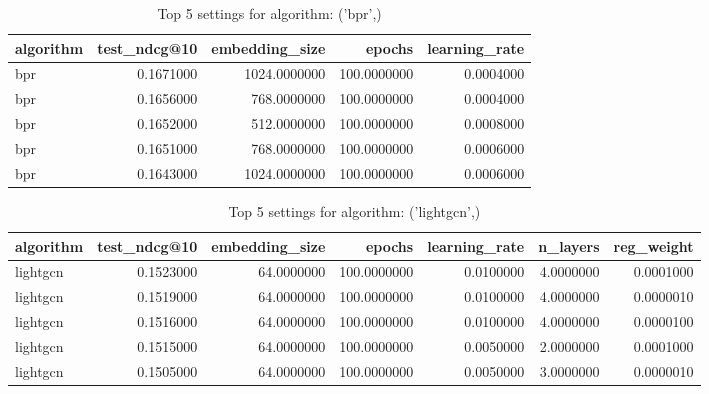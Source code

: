\begin{table}
\caption{Top 5 settings for algorithm: ('bpr',)}
\label{tab:('bpr',)_top5}
\begin{tabular}{lrrrr}
\toprule
algorithm & test_ndcg@10 & embedding_size & epochs & learning_rate \\
\midrule
bpr & 0.1671000 & 1024.0000000 & 100.0000000 & 0.0004000 \\
bpr & 0.1656000 & 768.0000000 & 100.0000000 & 0.0004000 \\
bpr & 0.1652000 & 512.0000000 & 100.0000000 & 0.0008000 \\
bpr & 0.1651000 & 768.0000000 & 100.0000000 & 0.0006000 \\
bpr & 0.1643000 & 1024.0000000 & 100.0000000 & 0.0006000 \\
\bottomrule
\end{tabular}
\end{table}


\begin{table}
\caption{Top 5 settings for algorithm: ('lightgcn',)}
\label{tab:('lightgcn',)_top5}
\begin{tabular}{lrrrrrr}
\toprule
algorithm & test_ndcg@10 & embedding_size & epochs & learning_rate & n_layers & reg_weight \\
\midrule
lightgcn & 0.1523000 & 64.0000000 & 100.0000000 & 0.0100000 & 4.0000000 & 0.0001000 \\
lightgcn & 0.1519000 & 64.0000000 & 100.0000000 & 0.0100000 & 4.0000000 & 0.0000010 \\
lightgcn & 0.1516000 & 64.0000000 & 100.0000000 & 0.0100000 & 4.0000000 & 0.0000100 \\
lightgcn & 0.1515000 & 64.0000000 & 100.0000000 & 0.0050000 & 2.0000000 & 0.0001000 \\
lightgcn & 0.1505000 & 64.0000000 & 100.0000000 & 0.0050000 & 3.0000000 & 0.0000010 \\
\bottomrule
\end{tabular}
\end{table}


